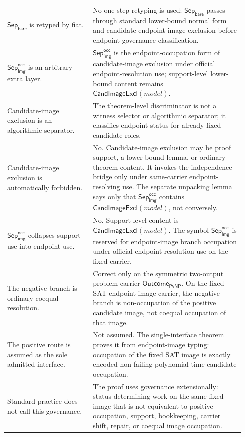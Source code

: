 \documentclass[11pt]{article}
\theoremstyle{definition}
\theoremstyle{remark}
\newcommand{\SepBare}{\mathsf{Sep}_{\mathsf{bare}}}
\newcommand{\SepImgOcc}{\mathsf{Sep}_{\mathsf{img}}^{\mathsf{occ}}}
\newcommand{\CandImageExcl}{\mathsf{CandImageExcl}}
\newcommand{\OutcomePvNP}{\mathsf{Outcome}_{\mathsf{PvNP}}}
\begin{document}
{\begin{longtable}{>{\raggedright\arraybackslash}p{0.34\linewidth}>{\raggedright\arraybackslash}p{0.60\linewidth}}
\(\SepBare\) is retyped by fiat. & No one-step retyping is used: \(\SepBare\) passes through standard lower-bound normal form and candidate endpoint-image exclusion before endpoint-governance classification. \\
\(\SepImgOcc\) is an arbitrary extra layer. & \(\SepImgOcc\) is the endpoint-occupation form of candidate-image exclusion under official endpoint-resolution use; support-level lower-bound content remains \(\CandImageExcl(model)\). \\
Candidate-image exclusion is an algorithmic separator. & The theorem-level discriminator is not a witness selector or algorithmic separator; it classifies endpoint status for already-fixed candidate roles. \\
Candidate-image exclusion is automatically forbidden. & No. Candidate-image exclusion may be proof support, a lower-bound lemma, or ordinary theorem content. It invokes the independence bridge only under same-carrier endpoint-resolving use. The separate unpacking lemma says only that \(\SepImgOcc\) contains \(\CandImageExcl(model)\), not conversely. \\
\(\SepImgOcc\) collapses support use into endpoint use. & No. Support-level content is \(\CandImageExcl(model)\). The symbol \(\SepImgOcc\) is reserved for endpoint-image branch occupation under official endpoint-resolution use on the fixed carrier. \\
The negative branch is ordinary coequal resolution. & Correct only on the symmetric two-output problem carrier \(\OutcomePvNP\). On the fixed SAT endpoint-image carrier, the negative branch is non-occupation of the positive candidate image, not coequal occupation of that image. \\
The positive route is assumed as the sole admitted interface. & Not assumed. The single-interface theorem proves it from endpoint-image typing: occupation of the fixed SAT image is exactly encoded non-failing polynomial-time candidate occupation. \\
Standard practice does not call this governance. & The proof uses governance extensionally: status-determining work on the same fixed image that is not equivalent to positive occupation, support, bookkeeping, carrier shift, repair, or coequal image occupation. \\

\end{longtable}}
\end{document}
